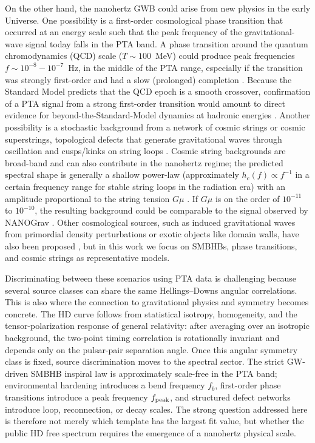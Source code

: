 \documentclass[symmetry,article,submit,pdftex,moreauthors]{Definitions/mdpi}
\begin{document}
On the other hand, the nanohertz GWB could arise from new physics in the early Universe. One possibility is a first-order cosmological phase transition that occurred at an energy scale such that the peak frequency of the gravitational-wave signal today falls in the PTA band. A phase transition around the quantum chromodynamics (QCD) scale ($T\sim 100$~MeV) could produce peak frequencies $f \sim 10^{-8}-10^{-7}$~Hz, in the middle of the PTA range, especially if the transition was strongly first-order and had a slow (prolonged) completion \cite{Gouttenoire2023}. Because the Standard Model predicts that the QCD epoch is a smooth crossover, confirmation of a PTA signal from a strong first-order transition would amount to direct evidence for beyond-the-Standard-Model dynamics at hadronic energies \cite{Gouttenoire2023}. Another possibility is a stochastic background from a network of cosmic strings or cosmic superstrings, topological defects that generate gravitational waves through oscillation and cusps/kinks on string loops \cite{Ellis2023}. Cosmic string backgrounds are broad-band and can also contribute in the nanohertz regime; the predicted spectral shape is generally a shallow power-law (approximately $h_c(f)\propto f^{-1}$ in a certain frequency range for stable string loops in the radiation era) with an amplitude proportional to the string tension $G\mu$ \cite{BlancoPillado2018}. If $G\mu$ is on the order of $10^{-11}$ to $10^{-10}$, the resulting background could be comparable to the signal observed by NANOGrav \cite{Ellis2023}. Other cosmological sources, such as induced gravitational waves from primordial density perturbations or exotic objects like domain walls, have also been proposed \cite{NANOGrav15-NewPhys}, but in this work we focus on SMBHBs, phase transitions, and cosmic strings as representative models.

Discriminating between these scenarios using PTA data is challenging because several source classes can share the same Hellings--Downs angular correlations. This is also where the connection to gravitational physics and symmetry becomes concrete. The HD curve follows from statistical isotropy, homogeneity, and the tensor-polarization response of general relativity: after averaging over an isotropic background, the two-point timing correlation is rotationally invariant and depends only on the pulsar-pair separation angle. Once this angular symmetry class is fixed, source discrimination moves to the spectral sector. The strict GW-driven SMBHB inspiral law is approximately scale-free in the PTA band; environmental hardening introduces a bend frequency $f_b$, first-order phase transitions introduce a peak frequency $f_{\rm peak}$, and structured defect networks introduce loop, reconnection, or decay scales. The strong question addressed here is therefore not merely which template has the largest fit value, but whether the public HD free spectrum requires the emergence of a nanohertz physical scale.
\end{document}
